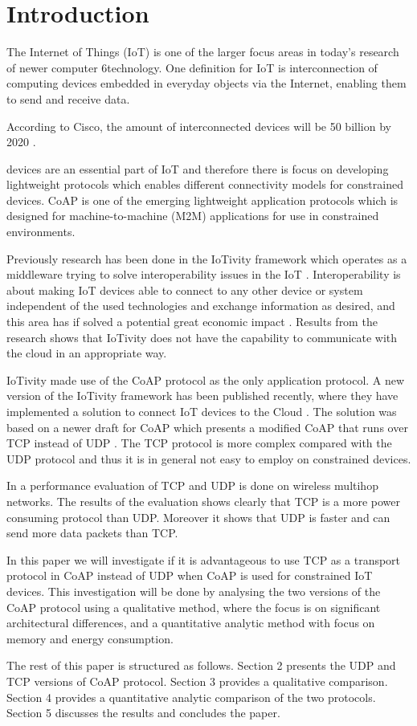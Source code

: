 \section{Introduction}
The Internet of Things (IoT) is one of the larger focus areas in today's research of newer computer 6technology. One definition for IoT is interconnection of computing devices embedded in everyday objects via the Internet, enabling them to send and receive data.

According to Cisco, the amount of interconnected devices will be 50 billion by 2020 \cite{cisco}.

 devices are an essential part of IoT and therefore there is focus on developing lightweight protocols which enables different connectivity models for constrained devices.  
CoAP is one of the emerging lightweight application protocols which is designed for machine-to-machine (M2M) applications for use in constrained environments.   

Previously research has been done in the IoTivity framework which operates as a middleware trying to solve interoperability issues in the IoT \cite{interoperabilityChallenge}. Interoperability is about making IoT devices able to connect to any other device or system independent of the used technologies and exchange information as desired, and this area has if solved a potential great economic impact \cite{McKinsey}. 
Results from the research shows that IoTivity does not have the capability to communicate with the cloud in an appropriate way. 

IoTivity made use of the CoAP protocol as the only application protocol. 
A new version of the IoTivity framework has been published recently, where they have implemented a solution to connect IoT devices to the Cloud \cite{iotivity1.1}. The solution was based on a newer draft for CoAP \cite{coapTCP} which presents a modified CoAP that runs over TCP instead of UDP \cite{coapUDP}.
The TCP protocol is more complex compared with the UDP protocol and thus it is in general not easy to employ on constrained devices. 

In \cite{TCPvsUDP} a performance evaluation of TCP and UDP is done on wireless multihop networks. The results of the evaluation shows clearly that TCP is a more power consuming protocol than UDP. Moreover it shows that UDP is faster and can send more data packets than TCP.

In this paper we will investigate if it is advantageous to use TCP as a transport protocol in CoAP instead of UDP when CoAP is used for constrained IoT devices. This investigation will be done by analysing the two versions of the CoAP protocol using a qualitative method, where the focus is on significant architectural differences, and a quantitative analytic method with focus on memory and energy consumption. 

The rest of this paper is structured as follows.  Section 2 presents the UDP and TCP versions of CoAP protocol. Section 3 provides a qualitative comparison. Section 4 provides a quantitative analytic comparison of the two protocols. Section 5 discusses the results and concludes the paper.     
